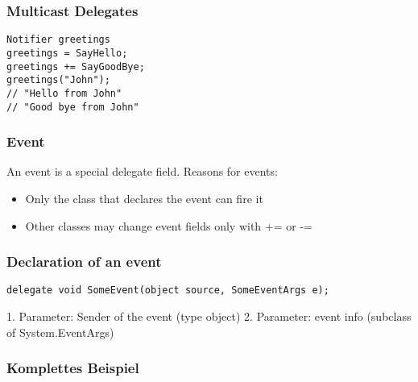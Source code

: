 \subsubsection{Multicast Delegates}
\begin{lstlisting}
Notifier greetings
greetings = SayHello;
greetings += SayGoodBye;
greetings("John");
// "Hello from John"
// "Good bye from John"
\end{lstlisting}

\subsubsection{Event}
An event is a special delegate field. Reasons for events:
\begin{itemize}
  \item Only the class that declares the event can fire it
  \item Other classes may change event fields only with += or -=
\end{itemize}

\subsubsection{Declaration of an event}
\begin{lstlisting}
delegate void SomeEvent(object source, SomeEventArgs e);
\end{lstlisting}
1. Parameter: Sender of the event (type object)
2. Parameter: event info (subclass of System.EventArgs)
\subsubsection{Komplettes Beispiel}


